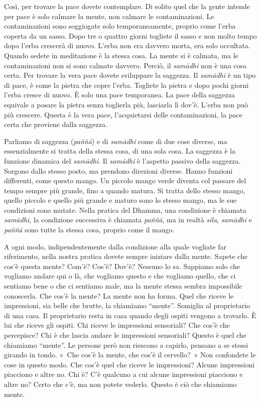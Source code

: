 Così, per trovare la pace dovete contemplare. Di solito quel che la
gente intende per pace è solo calmare la mente, non calmare le
contaminazioni. Le contaminazioni sono soggiogate solo temporaneamente,
proprio come l'erba coperta da un sasso. Dopo tre o quattro giorni
togliete il sasso e non molto tempo dopo l'erba crescerà di nuovo.
L'erba non era davvero morta, era solo occultata. Quando sedete in
meditazione è la stessa cosa. La mente si è calmata, ma le
contaminazioni non si sono calmate davvero. Perciò, il \emph{samādhi}
non è una cosa certa. Per trovare la vera pace dovete sviluppare la
saggezza. Il \emph{samādhi} è un tipo di pace, è come la pietra che
copre l'erba. Togliete la pietra e dopo pochi giorni l'erba cresce di
nuovo. È solo una pace temporanea. La pace della saggezza equivale a
posare la pietra senza toglierla più, lasciarla lì dov'è. L'erba non può
più crescere. Questa è la vera pace, l'acquietarsi delle contaminazioni,
la pace certa che proviene dalla saggezza.

Parliamo di saggezza (\emph{paññā}) e di \emph{samādhi} come di due cose
diverse, ma essenzialmente si tratta della stessa cosa, di una sola
cosa. La saggezza è la funzione dinamica del \emph{samādhi}. Il
\emph{samādhi} è l'aspetto passivo della saggezza. Sorgono dallo stesso
posto, ma prendono direzioni diverse. Hanno funzioni differenti, come
questo mango. Un piccolo mango verde diventa col passare del tempo
sempre più grande, fino a quando matura. Si tratta dello stesso mango,
quello piccolo e quello più grande e maturo sono lo stesso mango, ma le
sue condizioni sono mutate. Nella pratica del Dhamma, una condizione è
chiamata \emph{samādhi}, la condizione successiva è chiamata
\emph{paññā}, ma in realtà \emph{sīla}, \emph{samādhi} e \emph{paññā}
sono tutte la stessa cosa, proprio come il mango.

A ogni modo, indipendentemente dalla condizione alla quale vogliate far
riferimento, nella nostra pratica dovete sempre iniziare dalla mente.
Sapete che cos'è questa mente? Com'è? Cos'è? Dov'è? Nessuno lo sa.
Sappiamo solo che vogliamo andare qui o là, che vogliamo questo e che
vogliamo quello, che ci sentiamo bene o che ci sentiamo male, ma la
mente stessa sembra impossibile conoscerla. Che cos'è la mente? La mente
non ha forma. Quel che riceve le impressioni, sia belle che brutte, la
chiamiamo ``mente''. Somiglia al proprietario di una casa. Il
proprietario resta in casa quando degli ospiti vengono a trovarlo. È lui
che riceve gli ospiti. Chi riceve le impressioni sensoriali? Che cos'è
che percepisce? Chi è che lascia andare le impressioni sensoriali?
Questo è quel che chiamiamo ``mente''. Le persone però non riescono a
capirlo, pensano a se stessi girando in tondo. «~Che cos'è la mente, che
cos'è il cervello?~» Non confondete le cose in questo modo. Che cos'è
quel che riceve le impressioni? Alcune impressioni piacciono e altre no.
Chi è? C'è qualcuno a cui alcune impressioni piacciono e altre no? Certo
che c'è, ma non potete vederlo. Questo è ciò che chiamiamo mente.

